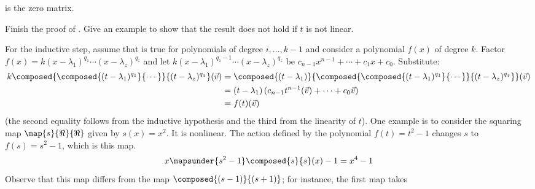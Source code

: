 \begin{exercises}
\begin{answer}
\begin{exparts}
\begin{equation*}
         \end{equation*}
         is the zero matrix.
       \end{exparts} 
     \end{answer}
   \recommended \item \label{exer:PolyMapsFactor}
      \begin{exparts}
        \partsitem Finish the proof of .
        \partsitem Give an example to show that the result does not hold
          if $t$ is not linear.
      \end{exparts}
      \begin{answer}
        \begin{exparts}
          \partsitem
            For the inductive step, assume that 
            is true for polynomials
            of degree \( i,\ldots,k-1 \) and consider a polynomial \( f(x) \)
            of degree \( k \). 
            Factor $f(x)=k(x-\lambda_1)^{q_1}\cdots(x-\lambda_z)^{q_z}$
            and let
            \( k(x-\lambda_1)^{q_1-1}\cdots(x-\lambda_z)^{q_z} \)
            be \( c_{n-1}x^{n-1}+\cdots+c_1x+c_0 \).
            Substitute:
            \begin{align*}
               k\composed{\composed{(t-\lambda_1)^{q_1}}{\cdots}}{
                                            (t-\lambda_z)^{q_z}}(\vec{v})
               &=
               \composed{(t-\lambda_1)}{
                  \composed{\composed{(t-\lambda_1)^{q_1}}{\cdots}}{
                  (t-\lambda_z)^{q_z}} }
                          (\vec{v})    \\
               &=
               (t-\lambda_1)\,(c_{n-1}t^{n-1}(\vec{v})+\cdots+c_0\vec{v}) \\
               &=
               f(t)(\vec{v})
            \end{align*}
           (the second equality follows from the inductive hypothesis and 
           the third from the linearity of \( t \)).
         \partsitem One example is to consider the squaring map
            $\map{s}{\Re}{\Re}$ given by $s(x)=x^2$.
            It is nonlinear.
            The action defined by the polynomial $f(t)=t^2-1$ 
            changes $s$ to $f(s)=s^2-1$, which is this map.
            \begin{equation*} 
              x\mapsunder{s^2-1} \composed{s}{s}(x)-1=x^4-1
            \end{equation*}
            Observe that this map differs from the map
            $\composed{(s-1)}{(s+1)}$; for instance, the first map takes

\end{exparts}
\end{answer}
\end{exercises}

